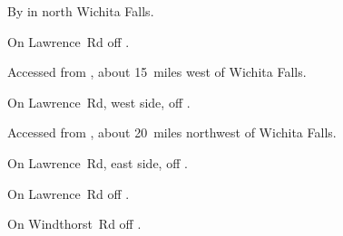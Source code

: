
\begin{LocationList}

By   in north Wichita Falls.

On Lawrence~Rd off  .

Accessed from  , about 15~miles west of Wichita Falls.

On Lawrence~Rd, west side, off  .

Accessed from , about 20~miles northwest of Wichita Falls.

On Lawrence~Rd, east side, off  .

On Lawrence~Rd off  .

\Location{\TruckStop \Gas \Rest \Service \Weigh}
On Windthorst~Rd off  .

\end{LocationList}
